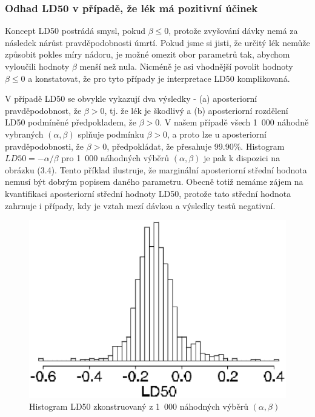 \subsubsection{Odhad LD50 v případě, že lék má pozitivní účinek}

Koncept LD50 postrádá smysl, pokud $\beta \le 0$, protože zvyšování dávky nemá za následek nárůst pravděpodobnosti úmrtí. Pokud jsme si jisti, že určitý lék nemůže způsobit pokles míry nádoru, je možné omezit obor parametrů tak, abychom vyloučili hodnoty $\beta$ menší než nula. Nicméně je asi vhodnější povolit hodnoty $\beta \le 0$ a konstatovat, že pro tyto případy je interpretace LD50 komplikovaná.

V případě LD50 se obvykle vykazují dva výsledky - (a) aposteriorní pravděpodobnost, že $\beta > 0$, tj. že lék je škodlivý a (b) aposteriorní rozdělení LD50 podmíněné předpokladem, že $\beta > 0$. V našem případě všech 1~000 náhodně vybraných $(\alpha, \beta)$ splňuje podmínku $\beta > 0$, a proto lze u aposteriorní pravděpodobnosti, že $\beta > 0$, předpokládat, že přesahuje 99.90\%. Histogram $LD50 = -\alpha / \beta$ pro 1~000 náhodných výběrů $(\alpha, \beta)$ je pak k dispozici na obrázku (3.4). Tento příklad ilustruje, že marginální aposteriorní střední hodnota nemusí být dobrým popisem daného parametru. Obecně totiž nemáme zájem na kvantifikaci aposteriorní střední hodnoty LD50, protože tato střední hodnota zahrnuje i případy, kdy je vztah mezí dávkou a výsledky testů negativní.
\begin{figure}[htp]
\centering
\includegraphics[scale = 0.35]{pictures/fig_3_4.eps}
\caption{Histogram LD50 zkonstruovaný z 1~000 náhodných výběrů $(\alpha, \beta)$}
\label{fig_3_4}
\end{figure}
